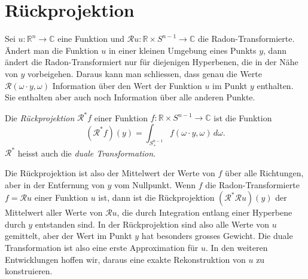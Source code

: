 %
%
%
\section{Rückprojektion
\label{buch:radon:section:rueckprojektion}}
Sei $u\colon \mathbb{R}^n\to\mathbb{C}$ eine Funktion und
$\mathscr{R}u\colon \mathbb{R}\times S^{n-1}\to\mathbb{C}$
die Radon-Transformierte.
Ändert man die Funktion $u$ in einer kleinen Umgebung eines Punkts $y$,
dann ändert die Radon-Transformiert nur für diejenigen Hyperbenen,
die in der Nähe von $y$ vorbeigehen.
Daraus kann man schliessen, dass genau die Werte
$\mathscr{R}(\omega\cdot y,\omega)$ Information über den Wert der
Funktion $u$ im Punkt $y$ enthalten.
Sie enthalten aber auch noch Information über alle anderen Punkte.

\begin{definition}
Die {\em Rückprojektion} $\mathscr{R}^*f$ einer Funktion
$f\colon \mathbb{R}\times S^{n-1}\to\mathbb{C}$ ist die Funktion
\[
(\mathscr{R}^*f)(y)
=
\int_{S_+^{n-1}} f(\omega\cdot y,\omega)\,d\omega.
\]
$\mathscr{R}^*$ heisst auch die {\em duale Transformation}.
\end{definition}

Die Rückprojektion ist also der Mittelwert der Werte von $f$ über
alle Richtungen, aber in der Entfernung von $y$ vom Nullpunkt.
Wenn $f$ die Radon-Transformierte $f=\mathscr{R}u$ einer Funktion $u$
ist, dann ist die Rückprojektion $(\mathscr{R}^*\mathscr{R}u)(y)$
der Mittelwert aller Werte von $\mathscr{R}u$, die durch Integration
entlang einer Hyperbene durch $y$ entstanden sind.
In der Rückprojektion sind also alle Werte von $u$ gemittelt, aber
der Wert im Punkt $y$ hat besonders grosses Gewicht.
Die duale Transformation ist also eine erste Approximation für $u$.
In den weiteren Entwicklungen hoffen wir, daraus eine exakte Rekonstruktion
von $u$ zu konstruieren.

%
%
